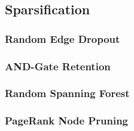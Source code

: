 \subsection{Sparsification}
\label{sec:method:reduction:sparsification}

\subsubsection{Random Edge Dropout}
\label{sec:method:sparse:dropout}

\subsubsection{AND-Gate Retention}
\label{sec:method:sparse:andgate}

\subsubsection{Random Spanning Forest}
\label{sec:method:sparse:forest}

\subsubsection{PageRank Node Pruning}
\label{sec:method:sparse:pagerank}

